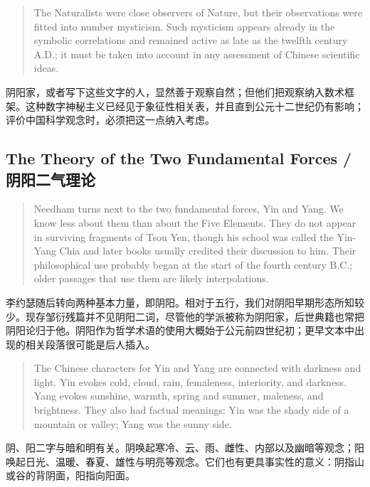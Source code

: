 \documentclass[UTF8,zihao=-4]{ctexart}
\newenvironment{enblock}
  {\par\smallskip\noindent{\scriptsize\bfseries English}\par\begin{quote}\small}
  {\end{quote}}
\newenvironment{zhblock}
  {\par\noindent{\scriptsize\bfseries 中文}\par}
  {\par\medskip}
\begin{document}
\begin{enblock}
The Naturalists were close observers of Nature, but their observations were fitted into number mysticism. Such mysticism appears already in the symbolic correlations and remained active as late as the twelfth century A.D.; it must be taken into account in any assessment of Chinese scientific ideas.
\end{enblock}
\begin{zhblock}
阴阳家，或者写下这些文字的人，显然善于观察自然；但他们把观察纳入数术框架。这种数字神秘主义已经见于象征性相关表，并且直到公元十二世纪仍有影响；评价中国科学观念时，必须把这一点纳入考虑。
\end{zhblock}

\subsection*{The Theory of the Two Fundamental Forces / 阴阳二气理论}

\begin{enblock}
Needham turns next to the two fundamental forces, Yin and Yang. We know less about them than about the Five Elements. They do not appear in surviving fragments of Tsou Yen, though his school was called the Yin-Yang Chia and later books usually credited their discussion to him. Their philosophical use probably began at the start of the fourth century B.C.; older passages that use them are likely interpolations.
\end{enblock}
\begin{zhblock}
李约瑟随后转向两种基本力量，即阴阳。相对于五行，我们对阴阳早期形态所知较少。现存邹衍残篇并不见阴阳二词，尽管他的学派被称为阴阳家，后世典籍也常把阴阳论归于他。阴阳作为哲学术语的使用大概始于公元前四世纪初；更早文本中出现的相关段落很可能是后人插入。
\end{zhblock}

\begin{enblock}
The Chinese characters for Yin and Yang are connected with darkness and light. Yin evokes cold, cloud, rain, femaleness, interiority, and darkness. Yang evokes sunshine, warmth, spring and summer, maleness, and brightness. They also had factual meanings: Yin was the shady side of a mountain or valley; Yang was the sunny side.
\end{enblock}
\begin{zhblock}
阴、阳二字与暗和明有关。阴唤起寒冷、云、雨、雌性、内部以及幽暗等观念；阳唤起日光、温暖、春夏、雄性与明亮等观念。它们也有更具事实性的意义：阴指山或谷的背阴面，阳指向阳面。
\end{zhblock}
\end{document}
